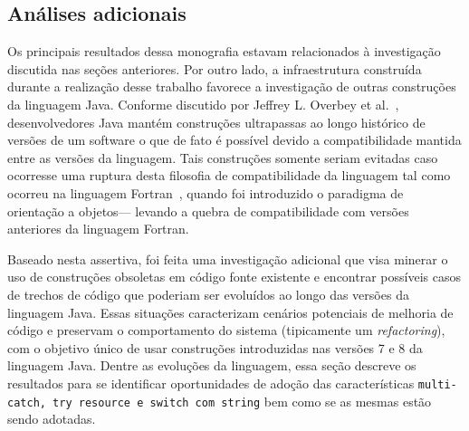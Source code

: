 \subsection{Análises adicionais}
Os principais resultados dessa monografia estavam relacionados à investigação discutida nas seções anteriores. Por outro lado, a infraestrutura construída  durante a realização desse trabalho favorece a investigação de outras construções da linguagem Java. Conforme discutido por Jeffrey L. Overbey et 
al.~\cite{Overbey:2009}, desenvolvedores Java mantém construções ultrapassas ao longo histórico de versões de um  software o que de fato é possível devido a compatibilidade mantida entre as versões da linguagem. Tais construções somente seriam evitadas caso ocorresse uma ruptura desta filosofia de compatibilidade da linguagem tal como ocorreu na linguagem Fortran~\cite{Overbey:2009}, 
quando foi  introduzido o paradigma de orientação a objetos--- levando a quebra de compatibilidade com versões anteriores da linguagem Fortran.

Baseado nesta assertiva, foi feita uma investigação adicional que visa minerar o uso de construções obsoletas 
em código fonte existente e encontrar possíveis casos de trechos de código que poderiam ser 
evoluídos ao longo das versões da linguagem Java. Essas situações caracterizam cenários potenciais de melhoria de código e preservam 
o comportamento do sistema (tipicamente um \textit{refactoring}), com o objetivo único de usar construções introduzidas nas versões 7 e 8 da linguagem Java.
Dentre as evoluções da linguagem, essa se\c c\~{a}o descreve os resultados 
para se identificar oportunidades de adoção das características 
\texttt{multi-catch, try resource e switch com string} 
bem como se as mesmas estão sendo adotadas.
%
%

